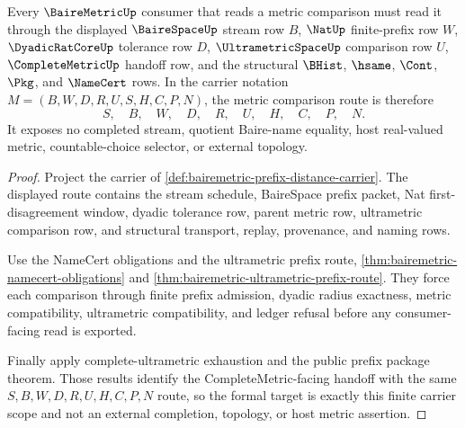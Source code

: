 \begin{theorem}
\label{thm:bairemetric-formal-target-scope}
Every $\BaireMetricUp$ consumer that reads a metric comparison must read it through the displayed $\BaireSpaceUp$ stream row $B$, $\NatUp$ finite-prefix row $W$, $\DyadicRatCoreUp$ tolerance row $D$, $\UltrametricSpaceUp$ comparison row $U$, $\CompleteMetricUp$ handoff row, and the structural $\BHist$, $\hsame$, $\Cont$, $\Pkg$, and $\NameCert$ rows. In the carrier notation $M=(B,W,D,R,U,S,H,C,P,N)$, the metric comparison route is therefore
$$
S,\quad B,\quad W,\quad D,\quad R,\quad U,\quad H,\quad C,\quad P,\quad N .
$$
It exposes no completed stream, quotient Baire-name equality, host real-valued metric, countable-choice selector, or external topology.
\end{theorem}
\begin{proof}
Project the carrier of \autoref{def:bairemetric-prefix-distance-carrier}. The displayed route contains the stream schedule, BaireSpace prefix packet, Nat first-disagreement window, dyadic tolerance row, parent metric row, ultrametric comparison row, and structural transport, replay, provenance, and naming rows.

Use the NameCert obligations and the ultrametric prefix route, \autoref{thm:bairemetric-namecert-obligations} and \autoref{thm:bairemetric-ultrametric-prefix-route}. They force each comparison through finite prefix admission, dyadic radius exactness, metric compatibility, ultrametric compatibility, and ledger refusal before any consumer-facing read is exported.

Finally apply complete-ultrametric exhaustion and the public prefix package theorem. Those results identify the CompleteMetric-facing handoff with the same $S,B,W,D,R,U,H,C,P,N$ route, so the formal target is exactly this finite carrier scope and not an external completion, topology, or host metric assertion.
\end{proof}

